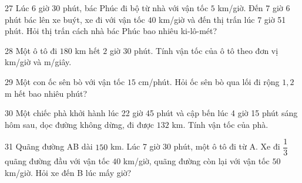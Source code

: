 \gap
\begin{probbox}{27}{\relax}
Lúc 6 giờ 30 phút, bác Phúc đi bộ từ nhà với vận tốc $5$ km/giờ. Đến 7 giờ 6 phút bác lên xe buýt, xe đi với vận tốc $40$ km/giờ và đến thị trấn lúc 7 giờ 51 phút. Hỏi thị trấn cách nhà bác Phúc bao nhiêu ki-lô-mét?
\end{probbox}
\gap
\begin{probbox}{28}{\relax}
Một ô tô đi $180$ km hết $2$ giờ $30$ phút. Tính vận tốc của ô tô theo đơn vị km/giờ và m/giây.
\end{probbox}
\gap
\begin{probbox}{29}{\relax}
Một con ốc sên bò với vận tốc $15$ cm/phút. Hỏi ốc sên bò qua lối đi rộng $1{,}2$ m hết bao nhiêu phút?
\end{probbox}
\gap
\begin{probbox}{30}{\relax}
Một chiếc phà khởi hành lúc 22 giờ 45 phút và cập bến lúc 4 giờ 15 phút sáng hôm sau, dọc đường không dừng, đi được $132$ km. Tính vận tốc của phà.
\end{probbox}
\begin{probbox}{31}{}
Quãng đường AB dài $150$ km. Lúc 7 giờ 30 phút, một ô tô đi từ A. Xe đi $\dfrac13$ quãng đường đầu với vận tốc $40$ km/giờ, quãng đường còn lại với vận tốc $50$ km/giờ. Hỏi xe đến B lúc mấy giờ?
\end{probbox}
